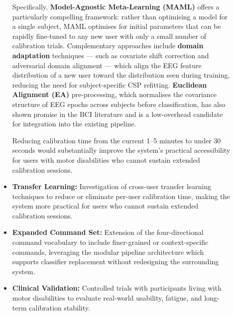 \documentclass[12pt, a4paper, oneside]{report}
\begin{document}
\begin{description}
\begin{itemize}
    Specifically, \textbf{Model-Agnostic Meta-Learning (MAML)} offers a
    particularly compelling framework: rather than optimising a model for a
    single subject, MAML optimises for initial parameters that can be rapidly
    fine-tuned to any new user with only a small number of calibration trials.
    Complementary approaches include \textbf{domain adaptation} techniques ---
    such as covariate shift correction and adversarial domain alignment --- which
    align the EEG feature distribution of a new user toward the distribution seen
    during training, reducing the need for subject-specific CSP refitting.
    \textbf{Euclidean Alignment (EA)} pre-processing, which normalises the
    covariance structure of EEG epochs across subjects before classification,
    has also shown promise in the BCI literature and is a low-overhead candidate
    for integration into the existing pipeline.

    Reducing calibration time from the current 1--5 minutes to under 30 seconds
    would substantially improve the system's practical accessibility for users
    with motor disabilities who cannot sustain extended calibration sessions.

    \item \textbf{Transfer Learning:} Investigation of cross-user transfer learning
    techniques to reduce or eliminate per-user calibration time, making the system
    more practical for users who cannot sustain extended calibration sessions.

    \item \textbf{Expanded Command Set:} Extension of the four-directional command
    vocabulary to include finer-grained or context-specific commands, leveraging the
    modular pipeline architecture which supports classifier replacement without
    redesigning the surrounding system.

    \item \textbf{Clinical Validation:} Controlled trials with participants living
    with motor disabilities to evaluate real-world usability, fatigue, and long-term
    calibration stability.
\end{itemize}

\clearpage
{}
\renewcommand{\bibname}{REFERENCES}

\begin{thebibliography}{99}


\end{thebibliography}
\end{description}
\end{document}
